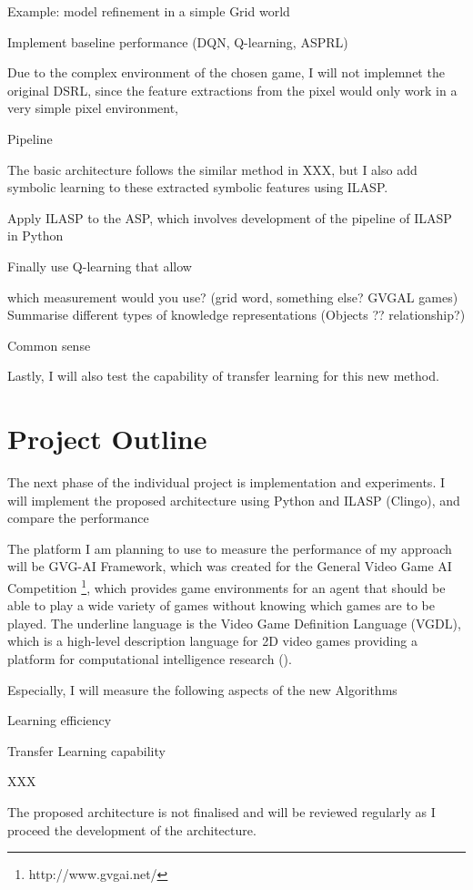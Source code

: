 \documentclass[12pt,twoside]{report}
\begin{document}
Example: model refinement in a simple Grid world


Implement baseline performance (DQN, Q-learning, ASPRL)

Due to the complex environment of the chosen game, I will not implemnet the original DSRL, since the feature extractions from the pixel would only work in a very simple pixel environment,

Pipeline

The basic architecture follows the similar method in XXX, but I also add symbolic learning to these extracted symbolic features using ILASP.

Apply ILASP to the ASP, which involves development of the pipeline of ILASP in Python

Finally use Q-learning that allow

which measurement would you use? (grid word, something else? GVGAL games)
Summarise different types of knowledge representations (Objects ?? relationship?)

Common sense

Lastly, I will also test the capability of transfer learning for this new method.

\section{Project Outline}

The next phase of the individual project is implementation and experiments. I will implement the proposed architecture using Python and ILASP (Clingo), and compare the performance

The platform I am planning to use to measure the performance of my approach will be GVG-AI Framework, which was created for the General Video Game AI Competition \footnote{http://www.gvgai.net/}, which provides game environments for an agent that should be able to play a wide variety of games without knowing which games are to be played.
The underline language is the Video Game Definition Language (VGDL), which is a high-level description language for 2D video games providing a platform for computational intelligence research (\cite{Schaul2013}).

Especially, I will measure the following aspects of the new Algorithms

Learning efficiency

Transfer Learning capability

XXX


The proposed architecture is not finalised and will be reviewed regularly as I proceed the development of the architecture.
\end{document}
